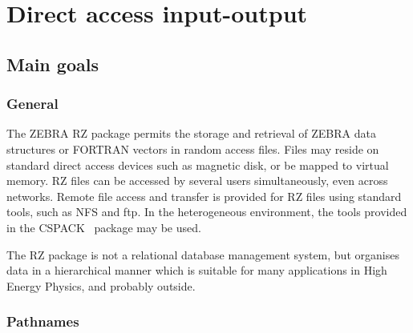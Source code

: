 

\chapter{Direct access input-output}

\section{Main goals}

\subsection{General}

The ZEBRA RZ package permits the storage and retrieval of 
ZEBRA data structures or FORTRAN vectors 
in random access files. Files may reside on standard
direct access devices such as magnetic disk, or be
mapped to virtual memory. 
RZ files can be accessed by several users simultaneously,
even across networks.
Remote file access and transfer is provided for RZ files
using standard tools, such as NFS and ftp. In the heterogeneous
environment, the tools provided in the CSPACK~\cite{bib-CSPACK} 
package may be used.

The RZ package is not a relational database management system,
but organises data in a hierarchical manner which is suitable
for many applications in High Energy Physics, and probably outside.

\subsection{Pathnames}


